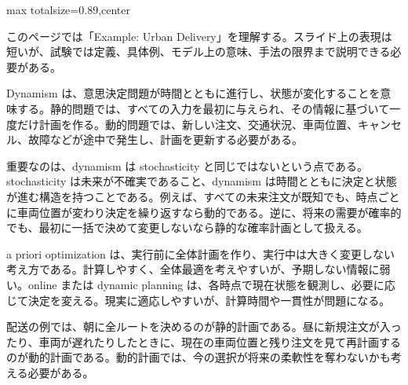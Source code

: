\begin{minipage}[t]{0.58\textwidth}
\begin{adjustbox}{max totalsize={\textwidth}{0.89\textheight},center}
\begin{minipage}{\textwidth}\scriptsize
{}このページでは「Example: Urban Delivery」を理解する。スライド上の表現は短いが、試験では定義、具体例、モデル上の意味、手法の限界まで説明できる必要がある。\par
Dynamism は、意思決定問題が時間とともに進行し、状態が変化することを意味する。静的問題では、すべての入力を最初に与えられ、その情報に基づいて一度だけ計画を作る。動的問題では、新しい注文、交通状況、車両位置、キャンセル、故障などが途中で発生し、計画を更新する必要がある。\par
重要なのは、dynamism は stochasticity と同じではないという点である。stochasticity は未来が不確実であること、dynamism は時間とともに決定と状態が進む構造を持つことである。例えば、すべての未来注文が既知でも、時点ごとに車両位置が変わり決定を繰り返すなら動的である。逆に、将来の需要が確率的でも、最初に一括で決めて変更しないなら静的な確率計画として扱える。\par
a priori optimization は、実行前に全体計画を作り、実行中は大きく変更しない考え方である。計算しやすく、全体最適を考えやすいが、予期しない情報に弱い。online または dynamic planning は、各時点で現在状態を観測し、必要に応じて決定を変える。現実に適応しやすいが、計算時間や一貫性が問題になる。\par
配送の例では、朝に全ルートを決めるのが静的計画である。昼に新規注文が入ったり、車両が遅れたりしたときに、現在の車両位置と残り注文を見て再計画するのが動的計画である。動的計画では、今の選択が将来の柔軟性を奪わないかも考える必要がある。\par

\end{minipage}
\end{adjustbox}
\end{minipage}

